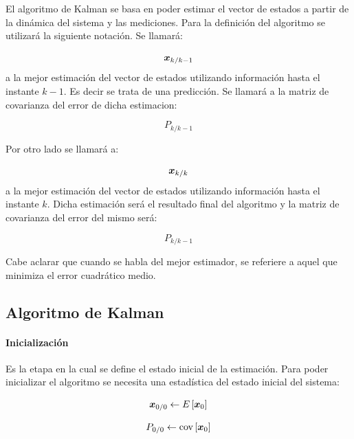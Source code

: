
	El algoritmo de Kalman se basa en poder estimar el vector de estados a partir de la dinámica del sistema y las mediciones. Para la definición del algoritmo se utilizará la siguiente notación. Se llamará:
	
	\begin{equation*}
		\boldsymbol{x}_{k/k - 1}
	\end{equation*}
	a la mejor estimación del vector de estados utilizando información hasta el instante $k - 1$. Es decir se trata de una predicción. Se llamará a la matriz de covarianza del error de dicha estimacion:
	
	\begin{equation*}
		P_{k/k - 1}
	\end{equation*}
	
	Por otro lado se llamará a:
	
	\begin{equation*}
		\boldsymbol{x}_{k/k}
	\end{equation*}
	a la mejor estimación del vector de estados utilizando información hasta el instante $k$. Dicha estimación será el resultado final del algoritmo y la matriz de covarianza del error del mismo será:
	
	\begin{equation*}
		P_{k/k - 1}
	\end{equation*}

	Cabe aclarar que cuando se habla del mejor estimador, se referiere a aquel que minimiza el error cuadrático medio.\\
	
		\subsection{Algoritmo de Kalman}
			\paragraph{Inicialización}
				Es la etapa en la cual se define el estado inicial de la estimación. Para poder inicializar el algoritmo se necesita una estadística del estado inicial del sistema:
				
				\begin{equation*}
					\boldsymbol{x}_{0/0} \leftarrow E\left[\boldsymbol{x}_{0}\right]
				\end{equation*}
				
				\begin{equation*}
					P_{0/0} \leftarrow \text{cov}\left[\boldsymbol{x}_{0}\right]
				\end{equation*}
